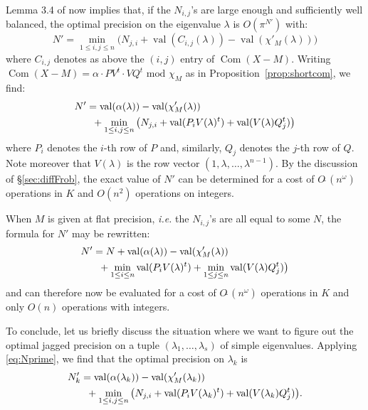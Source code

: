 \documentclass{sig-alternate-05-2015}
\DeclareMathOperator{\val}{val}
\DeclareMathOperator{\com}{Com}
\newcommand{\softO}{O\tilde{~}}
\begin{document}
\noindent
Lemma 3.4 of \cite{caruso-roe-vaccon:14a} now implies that, if the
$N_{i,j}$'s are large enough and sufficiently well balanced, the optimal
precision on the eigenvalue $\lambda$ is $O(\pi^{N'})$ with:
$$N' = \min_{1 \leq i, j\leq n} \big(N_{j,i} + \val(C_{i,j}(\lambda)) - 
\val(\chi'_M(\lambda))\big)$$
where $C_{i,j}$ denotes as above the $(i,j)$ entry of $\com(X{-}M)$.
Writing
$\com(X{-}M) = \alpha \cdot P V^t \cdot V Q^t \text{ mod } \chi_M$
as in Proposition~\ref{prop:shortcom}, we find:
\begin{align}
N' & = \val(\alpha(\lambda)) - \val(\chi'_M(\lambda)) \nonumber \\
& \hspace{2mm} + \min_{1 \leq i, j\leq n} \big(N_{j,i} + 
\val(P_i V(\lambda)^t) + \val(V(\lambda) Q_j^t)\big) \label{eq:Nprime}
\end{align}
where $P_i$ denotes the $i$-th row of $P$ and, similarly, $Q_j$
denotes the $j$-th row of $Q$. Note moreover that $V(\lambda)$ is
the row vector $(1, \lambda, \ldots, \lambda^{n-1})$.
By the discussion of \S \ref{sec:diffFrob}, the exact value of $N'$ can be 
determined for a cost of $\softO(n^\omega)$ operations in $K$ and
$O(n^2)$ operations on integers. 

When $M$ is given at flat precision, \emph{i.e.} the $N_{i,j}$'s are all 
equal to some $N$, the formula for $N'$ may be rewritten:
\begin{align}
N' & = N + \val(\alpha(\lambda)) - \val(\chi'_M(\lambda)) \nonumber \\
& \hspace{2mm} + \min_{1 \leq i \leq n} \val(P_i V(\lambda)^t)
+ \min_{1 \leq j \leq n} \val(V(\lambda) Q_j^t)\big) \label{eq:Nprimeflat}
\end{align}
and can therefore now be evaluated for a cost of $\softO(n^\omega)$
operations in $K$ and only $O(n)$ operations with integers.

\medskip

To conclude, let us briefly discuss the situation where we want
to figure out the optimal jagged precision on a tuple $(\lambda_1,
\ldots, \lambda_s)$ of simple eigenvalues. Applying \eqref{eq:Nprime},
we find that the optimal precision on $\lambda_k$ is 
\begin{align*}
N'_k & = \val(\alpha(\lambda_k)) - \val(\chi'_M(\lambda_k)) \\
& \hspace{2mm} + \min_{1 \leq i, j\leq n} \big(N_{j,i} + 
\val(P_i V(\lambda_k)^t) + \val(V(\lambda_k) Q_j^t)\big).
\end{align*}
\end{document}
